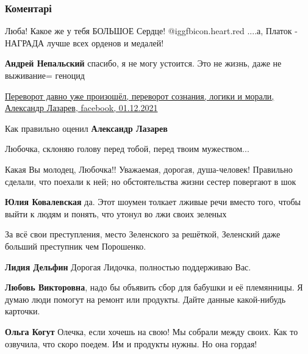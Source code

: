  
 
 
 
 
\subsubsection{Коментарі}

\begin{itemize} %

Люба! Какое же у тебя БОЛЬШОЕ Сердце! @igg{fbicon.heart.red}
....а, Платок - НАГРАДА лучше всех орденов и медалей!

\textbf{Андрей Непальский} спасибо, я не могу устоится. Это не жизнь, даже не выживание= геноцид


\href{https://www.facebook.com/100008532614385/posts/2735352603425800/}{%
Переворот давно уже произошёл, переворот сознания, логики и морали, Александр Лазарев, facebook, %
01.12.2021%
}

Как правильно оценил \textbf{Александр Лазарев}

Любочка, склоняю голову перед тобой, перед твоим мужеством...

Какая Вы молодец, Любочка!! Уважаемая, дорогая, душа-человек! Правильно сделали, что поехали к ней; но обстоятельства жизни сестер повергают в шок

\textbf{Юлия Ковалевская} да.
Этот шоумен толкает лживые речи вместо того, чтобы выйти к людям и понять, что утонул во лжи своих зеленых

За всё свои преступления, место Зеленского за решёткой, Зеленский даже больший преступник чем Порошенко.

\textbf{Лидия Дельфин} Дорогая Лидочка, полностью поддерживаю Вас.

\textbf{Любовь Викторовна}, надо бы объявить сбор для бабушки и её племянницы. Я думаю люди помогут на ремонт или продукты. Дайте данные какой-нибудь карточки.

\begin{itemize} %
\textbf{Ольга Когут} Олечка, если хочешь на свою! Мы собрали между своих. Как то озвучила, что скоро поедем.
Им и продукты нужны. Но она гордая!


\end{itemize}
\end{itemize}
